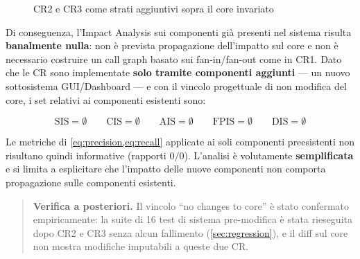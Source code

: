 \documentclass[11pt,a4paper]{article}
\newcommand{\baselineName}{MARK 2.0}
\newcommand{\SIS}{\textrm{SIS}}
\newcommand{\CIS}{\textrm{CIS}}
\newcommand{\AIS}{\textrm{AIS}}
\newcommand{\FPIS}{\textrm{FPIS}}
\newcommand{\DIS}{\textrm{DIS}}
\newcommand{\setempty}{\ensuremath{\emptyset}}
\newenvironment{keypoints}
  {\begin{quote}\small}
  {\end{quote}}
\begin{document}
\begin{figure}[H]
  \centering
  \caption{CR2 e CR3 come strati aggiuntivi sopra il core invariato}
  \label{fig:ia-layers}
\end{figure}

Di conseguenza, l'Impact Analysis sui componenti gi\`a presenti nel sistema
risulta \textbf{banalmente nulla}: non \`e prevista propagazione dell'impatto sul
core e non \`e necessario costruire un call graph basato sui fan-in/fan-out come
in CR1. Dato che le CR sono implementate \textbf{solo tramite componenti
aggiunti} --- un nuovo sottosistema GUI/Dashboard --- e con il vincolo
progettuale di non modifica del core, i set relativi ai componenti esistenti
sono:

\begin{equation*}
  \SIS = \setempty \qquad
  \CIS = \setempty \qquad
  \AIS = \setempty \qquad
  \FPIS = \setempty \qquad
  \DIS = \setempty
\end{equation*}

Le metriche di \cref{eq:precision,eq:recall} applicate ai soli componenti
preesistenti non risultano quindi informative (rapporti $0/0$). L'analisi \`e
volutamente \textbf{semplificata} e si limita a esplicitare che l'impatto delle
nuove componenti non comporta propagazione sulle componenti esistenti.

\begin{keypoints}
\textbf{Verifica a posteriori.} Il vincolo ``no changes to core'' \`e stato
confermato empiricamente: la suite di 16 test di sistema pre-modifica \`e stata
rieseguita dopo CR2 e CR3 senza alcun fallimento (\cref{sec:regression}), e il
diff sul core non mostra modifiche imputabili a queste due CR.
\end{keypoints}
\end{document}
